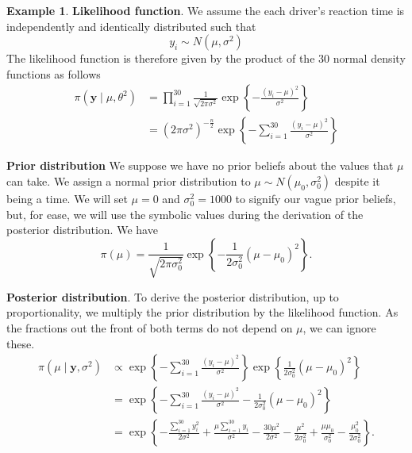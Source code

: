 \documentclass[
]{book}
\theoremstyle{definition}
\theoremstyle{definition}
\newtheorem{example}{Example}[chapter]
\theoremstyle{definition}
\theoremstyle{definition}
\theoremstyle{remark}
\begin{document}
\begin{example}
\textbf{Likelihood function}. We assume the each driver's reaction time is independently and identically distributed such that
\[
y_i \sim N(\mu, \sigma^2)
\]
The likelihood function is therefore given by the product of the 30 normal density functions as follows
\begin{align*}
\pi(\boldsymbol{y} \mid \mu, \theta^2) &= \prod_{i=1}^{30} \frac{1}{\sqrt{2\pi\sigma^2}}\exp\left\{-\frac{(y_i - \mu)^2}{\sigma^2}\right\} \\
&= (2\pi\sigma^2)^{-\frac{n}{2}}\exp\left\{-\sum_{i=1}^{30}\frac{(y_i - \mu)^2}{\sigma^2}\right\} 
\end{align*}

\textbf{Prior distribution} We suppose we have no prior beliefs about the values that \(\mu\) can take. We assign a normal prior distribution to \(\mu \sim N(\mu_0, \sigma_0^2)\) despite it being a time. We will set \(\mu = 0\) and \(\sigma_0^2 = 1000\) to signify our vague prior beliefs, but, for ease, we will use the symbolic values during the derivation of the posterior distribution. We have
\[
\pi(\mu) = \frac{1}{\sqrt{2\pi\sigma_0^2}}\exp\left\{-\frac{1}{2\sigma_0^2}(\mu - \mu_0)^2\right\}.
\]

\textbf{Posterior distribution}. To derive the posterior distribution, up to proportionality, we multiply the prior distribution by the likelihood function. As the fractions out the front of both terms do not depend on \(\mu\), we can ignore these.
\begin{align*}
\pi(\mu \mid \boldsymbol{y}, \sigma^2) &\propto\exp\left\{-\sum_{i=1}^{30}\frac{(y_i - \mu)^2}{\sigma^2}\right\}  \exp\left\{\frac{1}{2\sigma_0^2}(\mu - \mu_0)^2\right\} \\
& = \exp\left\{-\sum_{i=1}^{30}\frac{(y_i - \mu)^2}{\sigma^2}-\frac{1}{2\sigma_0^2}(\mu - \mu_0)^2\right\} \\
& = \exp\left\{-\frac{\sum_{i=1}^{30}y_i^2}{2\sigma^2} + \frac{\mu\sum_{i=1}^{30}y_i}{\sigma^2} - \frac{30\mu^2}{2\sigma^2} - \frac{\mu^2}{2\sigma_0^2} + \frac{\mu\mu_0}{\sigma_0^2} - \frac{\mu_0^2}{2\sigma_0^2}\right\}.
\end{align*}


\end{example}
\end{document}
